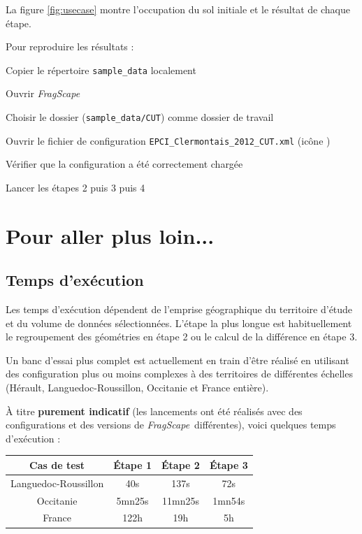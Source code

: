 \documentclass[11pt]{article}
\newcommand{\tool}{\emph{FragScape}}
\let\tempone\itemize
\let\temptwo\enditemize
\renewenvironment{itemize}{\tempone\addtolength{\itemsep}{-0.5\baselineskip}}{\temptwo}
\begin{document}
La figure \ref{fig:usecase} montre l'occupation du sol initiale et le résultat de chaque étape.

Pour reproduire les résultats :
\begin{itemize}
    \item Copier le répertoire \texttt{sample\_data} localement
    \item Ouvrir \tool
    \item Choisir le dossier (\texttt{sample\_data/CUT}) comme dossier de travail
    \item Ouvrir le fichier de configuration \texttt{EPCI\_Clermontais\_2012\_CUT.xml} (icône   )
    \item Vérifier que la configuration a été correctement chargée
    \item Lancer les étapes 2 puis 3 puis 4
\end{itemize}





\section{Pour aller plus loin...}

\subsection{Temps d'exécution}

Les temps d'exécution dépendent de l'emprise géographique du territoire d'étude et du volume de données sélectionnées. L'étape la plus longue est habituellement le regroupement des géométries en étape 2 ou le calcul de la différence en étape 3.

Un banc d'essai plus complet est actuellement en train d'être réalisé en utilisant des configuration plus ou moins complexes à des territoires de différentes échelles (Hérault, Languedoc-Roussillon, Occitanie et France entière).

À titre \textbf{purement indicatif} (les lancements ont été réalisés avec des configurations et des versions de \tool\ différentes), voici quelques temps d'exécution :

\begin{center}
\begin{tabular}{|c|ccc|}
    \hline
    Cas de test & Étape 1 & Étape 2 & Étape 3 \\
    \hline
    Languedoc-Roussillon & 40s & 137s & 72s \\
    Occitanie & 5mn25s & 11mn25s & 1mn54s \\
    France & 122h & 19h & 5h \\
    \hline
\end{tabular}
\end{center}
\end{document}
